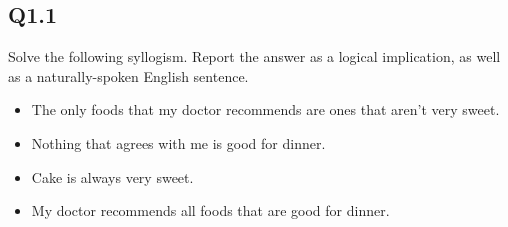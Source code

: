 \documentclass{article}
\begin{document}
\subsection*{Q1.1}
Solve the following syllogism. Report the answer as a logical implication, as well as a naturally-spoken English sentence.
\begin{itemize}
    \item The only foods that my doctor recommends are ones that aren't very sweet.
    \item Nothing that agrees with me is good for dinner.
    \item Cake is always very sweet.
    \item My doctor recommends all foods that are good for dinner.
\end{itemize}
\newpage
{}
\end{document}
